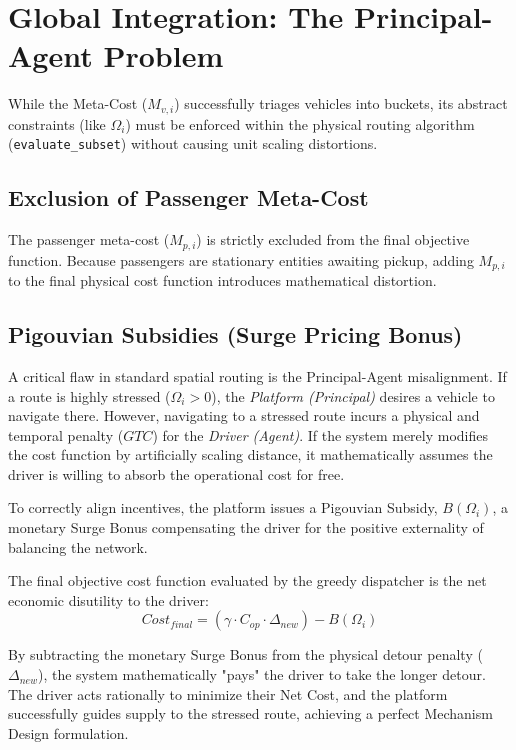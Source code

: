 \documentclass[12pt,a4paper]{article}
\begin{document}
\section{Global Integration: The Principal-Agent Problem}
While the Meta-Cost ($M_{v, i}$) successfully triages vehicles into buckets, its abstract constraints (like $\Omega_i$) must be enforced within the physical routing algorithm (\texttt{evaluate\_subset}) without causing unit scaling distortions.

\subsection{Exclusion of Passenger Meta-Cost}
The passenger meta-cost ($M_{p, i}$) is strictly excluded from the final objective function. Because passengers are stationary entities awaiting pickup, adding $M_{p, i}$ to the final physical cost function introduces mathematical distortion.

\subsection{Pigouvian Subsidies (Surge Pricing Bonus)}
A critical flaw in standard spatial routing is the Principal-Agent misalignment. If a route is highly stressed ($\Omega_i > 0$), the \textit{Platform (Principal)} desires a vehicle to navigate there. However, navigating to a stressed route incurs a physical and temporal penalty ($GTC$) for the \textit{Driver (Agent)}. If the system merely modifies the cost function by artificially scaling distance, it mathematically assumes the driver is willing to absorb the operational cost for free.

To correctly align incentives, the platform issues a Pigouvian Subsidy, $B(\Omega_i)$, a monetary Surge Bonus compensating the driver for the positive externality of balancing the network.

The final objective cost function evaluated by the greedy dispatcher is the net economic disutility to the driver:
\begin{equation}
    Cost_{final} = \left( \gamma \cdot C_{op} \cdot \Delta_{new} \right) - B(\Omega_i)
\end{equation}

By subtracting the monetary Surge Bonus from the physical detour penalty ($\Delta_{new}$), the system mathematically "pays" the driver to take the longer detour. The driver acts rationally to minimize their Net Cost, and the platform successfully guides supply to the stressed route, achieving a perfect Mechanism Design formulation.
\end{document}
